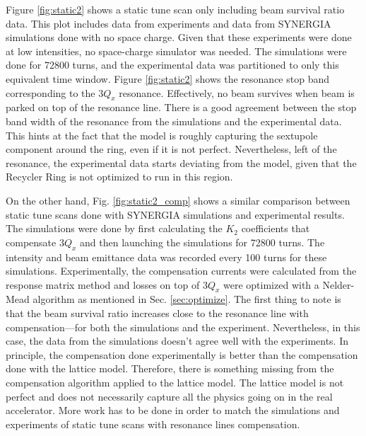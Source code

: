 Figure \ref{fig:static2} shows a static tune scan only including beam survival ratio data. This plot includes data from experiments and data from SYNERGIA simulations done with no space charge. Given that these experiments were done at low intensities, no space-charge simulator was needed. The simulations were done for 72800 turns, and the experimental data was partitioned to only this equivalent time window. Figure \ref{fig:static2} shows the resonance stop band corresponding to the $3Q_x$ resonance. Effectively, no beam survives when beam is parked on top of the resonance line. There is a good agreement between the stop band width of the resonance from the simulations and the experimental data. This hints at the fact that the model is roughly capturing the sextupole component around the ring, even if it is not perfect. Nevertheless, left of the resonance, the experimental data starts deviating from the model, given that the Recycler Ring is not optimized to run in this region.

On the other hand, Fig. \ref{fig:static2_comp} shows a similar comparison between static tune scans done with SYNERGIA simulations and experimental results. The simulations were done by first calculating the $K_2$ coefficients that compensate $3Q_x$ and then launching the simulations for 72800 turns. The intensity and beam emittance data was recorded every 100 turns for these simulations. Experimentally, the compensation currents were calculated from the response matrix method and losses on top of $3Q_x$ were optimized with a Nelder-Mead algorithm as mentioned in Sec. \ref{sec:optimize}. The first thing to note is that the beam survival ratio increases close to the resonance line with compensation---for both the simulations and the experiment. Nevertheless, in this case, the data from the simulations doesn't agree well with the experiments. In principle, the compensation done experimentally is better than the compensation done with the lattice model. Therefore, there is something missing from the compensation algorithm applied to the lattice model. The lattice model is not perfect and does not necessarily capture all the physics going on in the real accelerator. More work has to be done in order to match the simulations and experiments of static tune scans with resonance lines compensation. 

